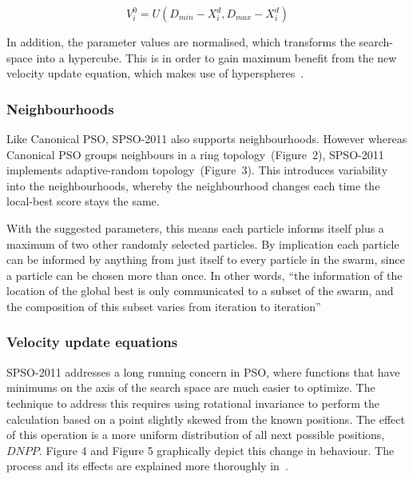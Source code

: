 \documentclass{csfourzero}
\begin{document}
\begin{equation}
  V_i^0 = U(D_{min} - X_i^d, D_{max} - X_i^d)
\end{equation}

In addition, the parameter values are normalised, which transforms the
search-space into a hypercube. This is in order to gain maximum benefit from the
new velocity update equation, which makes use of
hyperspheres~\cite{Clerc:2012to}.

\subsubsection{Neighbourhoods}

Like Canonical PSO, SPSO-2011 also supports neighbourhoods. However whereas
Canonical PSO groups neighbours in a ring topology~(Figure~2), SPSO-2011
implements adaptive-random topology~(Figure~3). This introduces variability into
the neighbourhoods, whereby the neighbourhood changes each time the local-best
score stays the same.

With the suggested parameters, this means each particle informs itself plus a
maximum of two other randomly selected particles. By implication each particle
can be informed by anything from just itself to every particle in the swarm,
since a particle can be chosen more than once. In other words, ``the information
of the location of the global best is only communicated to a subset of the
swarm, and the composition of this subset varies from iteration to
iteration''~\cite{Miranda:2007er}

\subsubsection{Velocity update equations}

SPSO-2011 addresses a long running concern in PSO, where functions that
have minimums on the axis of the search space are much easier to optimize. The
technique to address this requires using rotational invariance to perform the
calculation based on a point slightly skewed from the known positions. The
effect of this operation is a more uniform distribution of all next possible
positions, $DNPP$.  Figure 4 and Figure 5 graphically depict this change in
behaviour.  The process and its effects are explained more thoroughly
in~\cite{ZambranoBigiarini:2013dl}.
\end{document}
